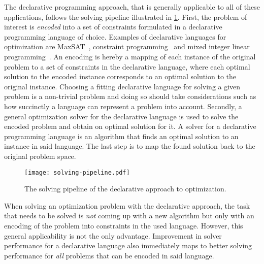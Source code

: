 The declarative programming approach, that is generally applicable to all of these applications, follows the solving pipeline illustrated in \cref{fig:solving-pipeline}.
First, the problem of interest is \emph{encoded} into a set of constraints formulated in a declarative programming language of choice.
Examples of declarative languages for optimization are MaxSAT~\autocite{handbook2-maxsat}, constraint programming~\autocite{DBLP:reference/fai/2} and mixed integer linear programming~\autocites{ChenEtAl2010-intro,KorteVygen2018-5}.
An encoding is hereby a mapping of each instance of the original problem to a set of constraints in the declarative language, where each optimal solution to the encoded instance corresponds to an optimal solution to the original instance.
Choosing a fitting declarative language for solving a given problem is a non-trivial problem and doing so should take considerations such as how succinctly a language can represent a problem into account.
Secondly, a general optimization solver for the declarative language is used to solve the encoded problem and obtain on optimal solution for it.
A solver for a declarative programming language is an algorithm that finds an optimal solution to an instance in said language.
The last step is to map the found solution back to the original problem space.

\begin{figure}
  \centering
  \texttt{[image: solving-pipeline.pdf]}
  \caption{The solving pipeline of the declarative approach to optimization.}\label{fig:solving-pipeline}
\end{figure}

When solving an optimization problem with the declarative approach, the task that needs to be solved is \emph{not} coming up with a new algorithm but only with an encoding of the problem into constraints in the used language.
However, this general applicability is not the only advantage.
Improvement in solver performance for a declarative language also immediately maps to better solving performance for \emph{all} problems that can be encoded in said language.

